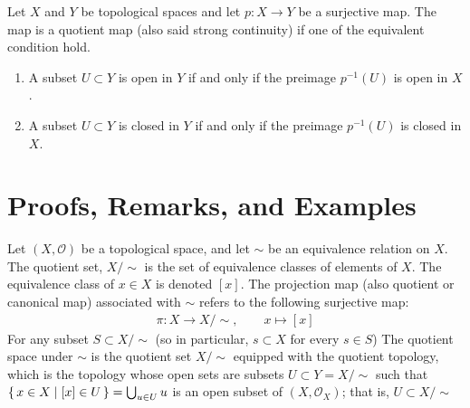 \begin{defbox}
    Let \(X\) and \(Y\) be topological spaces and let \(p: X \longrightarrow Y\) be a surjective map. The map is a quotient map (also said strong continuity) if one of the equivalent condition hold.
    \begin{enumerate}
        \item A subset \(U \subset Y\) is open in \(Y\) if and only if the preimage \(p^{-1}(U)\) is open in \(X\).
        \item A subset \(U \subset Y\) is closed in \(Y\) if and only if the preimage \(p^{-1}(U)\) is closed in \(X\).
    \end{enumerate}
\end{defbox}
\newpage
\section{Proofs, Remarks, and Examples}
\begin{defbox}
    \begin{definition}
        Let \((X, \mathcal{O})\) be a {\color{mathif}topological space}, and let \(\sim\) be an {\color{mathif}equivalence relation} on \(X\). The {\color{maththen}quotient set}, \(X / \sim\) is the {\color{mathobj}set} of {\color{mathobj}equivalence classes} of elements of \(X\). The equivalence class of \(x \in X\) is {\color{mathrem}denoted} \([x]\). The {\color{maththen}projection map} (also {\color{mathrem}quotient} or {\color{mathrem}canonical map}) associated with \(\sim\) refers to the following {\color{mathif}surjective map}:
        \begin{align*}
            \pi: X \longrightarrow X / \sim, \qquad x \mapsto [x]
        \end{align*}
        For any subset \(S \subset X / \sim\) (so in particular, \(s \subset X\) for every \(s \in S\))
        The quotient space under \(\sim\) is the quotient set \(X / \sim\) equipped with the quotient topology, which is the topology whose open sets are subsets \(U \subset Y = X / \sim\) such that \(\left\{\, x \in X \mid [x] \in U \,\right\} = \bigcup_{u \in U}u\) is an open subset of \((X, \mathcal{O}_X)\); that is, \(U \subset X / \sim\)
    \end{definition}
\end{defbox}


